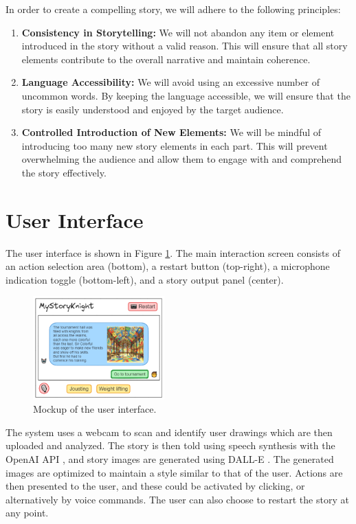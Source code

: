 \documentclass[submit,techrep,english]{ipsj}
\begin{document}
In order to create a compelling story, we will adhere to the following principles:

\begin{enumerate}
    \item \textbf{Consistency in Storytelling:} We will not abandon any item or element introduced in the story without a valid reason. This will ensure that all story elements contribute to the overall narrative and maintain coherence.
    \item \textbf{Language Accessibility:} We will avoid using an excessive number of uncommon words. By keeping the language accessible, we will ensure that the story is easily understood and enjoyed by the target audience.
    \item \textbf{Controlled Introduction of New Elements:} We will be mindful of introducing too many new story elements in each part. This will prevent overwhelming the audience and allow them to engage with and comprehend the story effectively.
\end{enumerate}


\section{User Interface}
\label{sec:user-interface}

The user interface is shown in Figure \ref{fig:user-interface}. The main interaction screen consists of an action selection area (bottom), a restart button (top-right), a microphone indication toggle (bottom-left), and a story output panel (center).

\begin{figure}[h]
    \centering
    \includegraphics[width=0.45\textwidth]{figures/user-interface.png}
    \caption{Mockup of the user interface.}
    \label{fig:user-interface}
\end{figure}

The system uses a webcam to scan and identify user drawings which are then uploaded and analyzed. The story is then told using speech synthesis with the OpenAI API \cite{20:openai-api}, and story images are generated using DALL-E \cite{21:dalle}. The generated images are optimized to maintain a style similar to that of the user. Actions are then presented to the user, and these could be activated by clicking, or alternatively by voice commands. The user can also choose to restart the story at any point.
\end{document}
